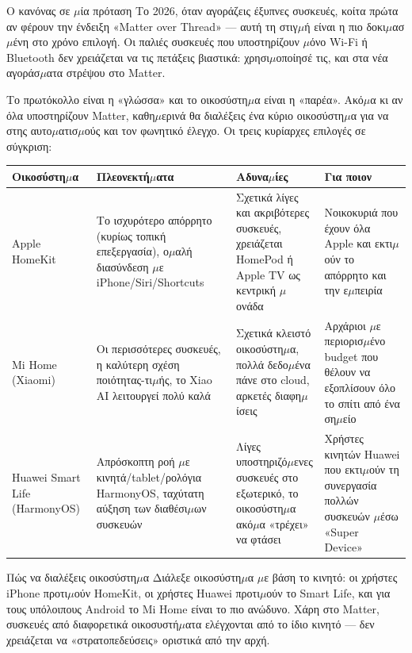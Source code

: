 \begin{tcbinfo}{Ο κανόνας σε $\mu$ία πρόταση}
Το 2026, όταν αγοράζεις έξυπνες συσκευές, κοίτα πρώτα αν φέρουν την ένδειξη «Matter over Thread» — αυτή τη στιγ$\mu$ή είναι η πιο δοκι$\mu$ασ$\mu$ένη στο χρόνο επιλογή. Οι παλιές συσκευές που υποστηρίζουν $\mu$όνο Wi-Fi ή Bluetooth δεν χρειάζεται να τις πετάξεις βιαστικά: χρησι$\mu$οποίησέ τις, και στα νέα αγοράσ$\mu$ατα στρέψου στο Matter.

\end{tcbinfo}


Το πρωτόκολλο είναι η «γλώσσα» και το οικοσύστη$\mu$α είναι η «παρέα». Ακό$\mu$α κι αν όλα υποστηρίζουν Matter, καθη$\mu$ερινά θα διαλέξεις ένα κύριο οικοσύστη$\mu$α για να στης αυτο$\mu$ατισ$\mu$ούς και τον φωνητικό έλεγχο. Οι τρεις κυρίαρχες επιλογές σε σύγκριση:

\begin{center}
\begin{tabularx}{\linewidth}{|X|X|X|X|}
\hline
\textbf{Οικοσύστη$\mu$α} & \textbf{Πλεονεκτή$\mu$ατα} & \textbf{Αδυνα$\mu$ίες} & \textbf{Για ποιον} \tabularnewline
\hline
Apple HomeKit & Το ισχυρότερο απόρρητο (κυρίως τοπική επεξεργασία), ο$\mu$αλή διασύνδεση $\mu$ε iPhone/Siri/Shortcuts & Σχετικά λίγες και ακριβότερες συσκευές, χρειάζεται HomePod ή Apple TV ως κεντρική $\mu$ονάδα & Νοικοκυριά που έχουν όλα Apple και εκτι$\mu$ούν το απόρρητο και την ε$\mu$πειρία \tabularnewline
Mi Home (Xiaomi) & Οι περισσότερες συσκευές, η καλύτερη σχέση ποιότητας-τι$\mu$ής, το Xiao AI λειτουργεί πολύ καλά & Σχετικά κλειστό οικοσύστη$\mu$α, πολλά δεδο$\mu$ένα πάνε στο cloud, αρκετές διαφη$\mu$ίσεις & Αρχάριοι $\mu$ε περιορισ$\mu$ένο budget που θέλουν να εξοπλίσουν όλο το σπίτι από ένα ση$\mu$είο \tabularnewline
Huawei Smart Life (HarmonyOS) & Απρόσκοπτη ροή $\mu$ε κινητά/tablet/ρολόγια HarmonyOS, ταχύτατη αύξηση των διαθέσι$\mu$ων συσκευών & Λίγες υποστηριζό$\mu$ενες συσκευές στο εξωτερικό, το οικοσύστη$\mu$α ακό$\mu$α «τρέχει» να φτάσει & Χρήστες κινητών Huawei που εκτι$\mu$ούν τη συνεργασία πολλών συσκευών $\mu$έσω «Super Device» \tabularnewline
\hline
\end{tabularx}
\end{center}

\begin{tcbinfo}{Πώς να διαλέξεις οικοσύστη$\mu$α}
Διάλεξε οικοσύστη$\mu$α $\mu$ε βάση το κινητό: οι χρήστες iPhone προτι$\mu$ούν HomeKit, οι χρήστες Huawei προτι$\mu$ούν το Smart Life, και για τους υπόλοιπους Android το Mi Home είναι το πιο ανώδυνο. Χάρη στο Matter, συσκευές από διαφορετικά οικοσυστή$\mu$ατα ελέγχονται από το ίδιο κινητό — δεν χρειάζεται να «στρατοπεδεύσεις» οριστικά από την αρχή.

\end{tcbinfo}

